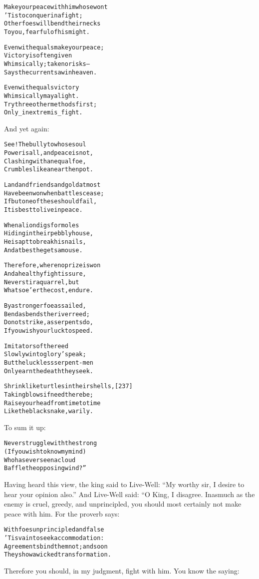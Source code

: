 \documentclass{article}
\renewenvironment{verbatim}{\begin{alltt}\normalfont\begin{centering}}{\end{centering}\end{alltt}}
\begin{document}
\begin{verbatim}
Make your peace with him whose wont
    'Tis to conquer in a fight;
Other foes will bend their necks
    To you, fearful of his might.

Even with equals make your peace;
    Victory is often given
Whimsically; take no risks--
    Says the current saw in heaven.

Even with equals victory
    Whimsically may alight.
Try three other methods first;
    Only _in extremis_ fight.
\end{verbatim}
And yet again:

\begin{verbatim}
See! The bully to whose soul
    Power is all, and peace is not,
Clashing with an equal foe,
    Crumbles like an earthen pot.

Land and friends and gold at most
    Have been won when battles cease;
If but one of these should fail,
    It is best to live in peace.

When a lion digs for moles
    Hiding in their pebbly house,
He is apt to break his nails,
    And at best he gets a mouse.

Therefore, where no prize is won
    And a healthy fight is sure,
Never stir a quarrel, but
    Whatsoe'er the cost, endure.

By a stronger foe assailed,
    Bend as bends the river reed;
Do not strike, as serpents do,
    If you wish your luck to speed.

Imitators of the reed
    Slowly win to glory's peak;
But the luckless serpent-men
    Only earn the death they seek.

Shrink like turtles in their shells,                    [237]
    Taking blows if need there be;
Raise your head from time to time
    Like the black snake, warily.
\end{verbatim}
To sum it up:

\begin{verbatim}
Never struggle with the strong
    (If you wish to know my mind)
Who has ever seen a cloud
    Baffle the opposing wind?”
\end{verbatim}
Having heard this view, the king said to Live-Well:
``My worthy sir, I desire to hear your opinion also.'' And
Live-Well said: “O King, I disagree. Inasmuch as the enemy is
cruel, greedy, and unprincipled, you should most certainly not make
peace with him. For the proverb says:

\begin{verbatim}
With foes unprincipled and false
    'Tis vain to seek accommodation:
Agreements bind them not; and soon
    They show a wicked transformation.
\end{verbatim}
Therefore you should, in my judgment, fight with him. You know the
saying:
\end{document}

